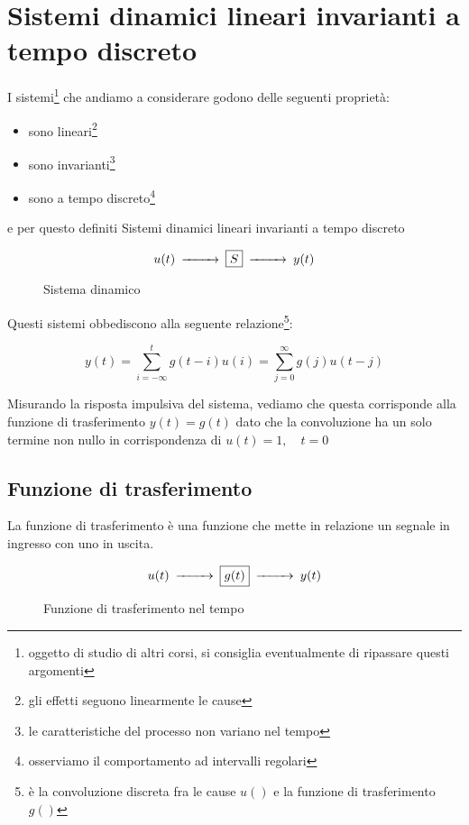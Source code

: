 \section{Sistemi dinamici lineari invarianti a tempo discreto}
I sistemi\footnote{oggetto di studio di altri corsi, si consiglia eventualmente di ripassare questi argomenti} che andiamo a considerare godono delle seguenti proprietà:
\begin{itemize}
  \item sono lineari\footnote{gli effetti seguono linearmente le cause}
  \item sono invarianti\footnote{le caratteristiche del processo non variano nel tempo}
  \item sono a tempo discreto\footnote{osserviamo il comportamento ad intervalli regolari}
\end{itemize}
e per questo definiti Sistemi dinamici lineari invarianti a tempo discreto
\begin{figure}[htbp]\Large
  \centering
  \[
    \begin{CD}
      u(t) @>>> \framebox{$S$} @>>> y(t)
    \end{CD}
  \]
  \caption{Sistema dinamico \label{fig:sistemadinamico}}
\end{figure}

\noindent Questi sistemi obbediscono alla seguente relazione\footnote{è la convoluzione discreta fra le cause $u()$ e la funzione di trasferimento $g()$}:

\[ y(t)=\sum_{i=-\infty}^{t}{g(t-i)u(i)}=\sum_{j=0}^{\infty}{g(j)u(t-j)}  \]

Misurando la risposta impulsiva del sistema, vediamo che questa corrisponde alla funzione di trasferimento $y(t)=g(t)$ dato che la convoluzione ha un solo termine non nullo in corrispondenza di $u(t)=1,\quad t=0$
\subsection{Funzione di trasferimento}
La funzione di trasferimento è una funzione che mette in relazione un segnale in ingresso con uno in uscita.

  \begin{figure}[htbp]\Large
    \centering
    \[
      \begin{CD}
        u(t) @>>> \framebox{$g(t)$} @>>> y(t)
      \end{CD}
    \]
    \caption{Funzione di trasferimento nel tempo \label{fig:funztrasftempo}}
  \end{figure}
  
